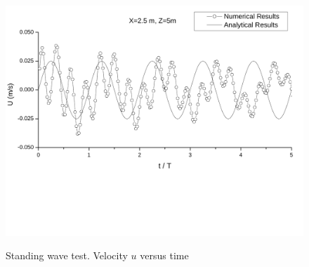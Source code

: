 \begin{figure}[htbp]
\vspace{0.9in}
\hspace{0.3in}
\includegraphics[scale=0.45]{../figures/SRM/U_X25_Z5_SRM_cropped_bottom24.pdf}
\label{fig:U_X25_Z5_SRM_cropped_bottom24}
\caption{Standing wave test. Velocity $u$ versus time}
\end{figure}


